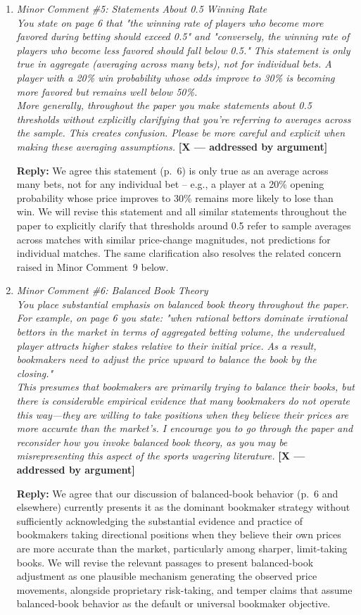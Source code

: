 \documentclass[letterpaper,12pt]{article}
\newcounter{b}
\newcommand{\argX}{\textcolor{green!55!black}{\textbf{[X --- addressed by argument]}}}
\newcommand{\Reply}[1]{\par\noindent\textbf{Reply:} #1}
\begin{document}
\begin{enumerate}
\item \textit{Minor Comment \#5: Statements About 0.5 Winning Rate\\[6pt]
You state on page 6 that "the winning rate of players who become more favored during betting should exceed 0.5" and "conversely, the winning rate of players who become less favored should fall below 0.5." This statement is only true in aggregate (averaging across many bets), not for individual bets. A player with a 20\% win probability whose odds improve to 30\% is becoming more favored but remains well below 50\%.\\[6pt]
More generally, throughout the paper you make statements about 0.5 thresholds without explicitly clarifying that you're referring to averages across the sample. This creates confusion. Please be more careful and explicit when making these averaging assumptions.} \argX

\Reply{We agree this statement (p.~6) is only true as an average across many bets, not for any individual bet -- e.g., a player at a 20\% opening probability whose price improves to 30\% remains more likely to lose than win. We will revise this statement and all similar statements throughout the paper to explicitly clarify that thresholds around 0.5 refer to sample averages across matches with similar price-change magnitudes, not predictions for individual matches. The same clarification also resolves the related concern raised in Minor Comment~9 below.}

\item \textit{Minor Comment \#6: Balanced Book Theory\\[6pt]
You place substantial emphasis on balanced book theory throughout the paper. For example, on page 6 you state: "when rational bettors dominate irrational bettors in the market in terms of aggregated betting volume, the undervalued player attracts higher stakes relative to their initial price. As a result, bookmakers need to adjust the price upward to balance the book by the closing."\\[6pt]
This presumes that bookmakers are primarily trying to balance their books, but there is considerable empirical evidence that many bookmakers do not operate this way—they are willing to take positions when they believe their prices are more accurate than the market's. I encourage you to go through the paper and reconsider how you invoke balanced book theory, as you may be misrepresenting this aspect of the sports wagering literature.} \argX

\Reply{We agree that our discussion of balanced-book behavior (p.~6 and elsewhere) currently presents it as the dominant bookmaker strategy without sufficiently acknowledging the substantial evidence and practice of bookmakers taking directional positions when they believe their own prices are more accurate than the market, particularly among sharper, limit-taking books. We will revise the relevant passages to present balanced-book adjustment as one plausible mechanism generating the observed price movements, alongside proprietary risk-taking, and temper claims that assume balanced-book behavior as the default or universal bookmaker objective.}


\end{enumerate}
\end{document}
